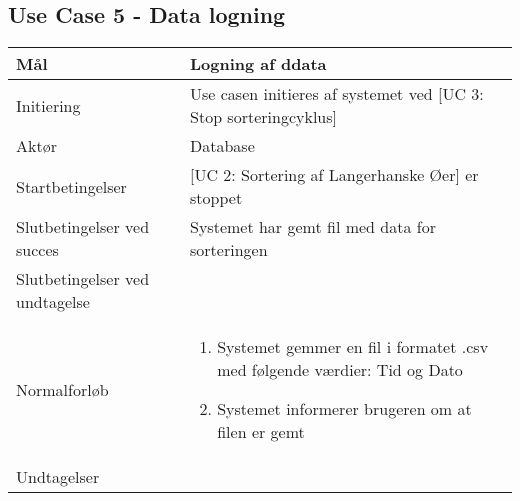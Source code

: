 \subsection{Use Case 5 - Data logning}
\begin{center}
		\begin{longtable}{ | m{4cm} | m{8cm}| } 
			\hline
			Mål & Logning af ddata \\ 
			\hline
			Initiering &  Use casen initieres af systemet ved [UC 3: Stop sorteringcyklus]\\
			\hline
			Aktør & Database \\ 
			\hline
			Startbetingelser & [UC 2: Sortering af Langerhanske Øer] er stoppet \\
			\hline	
			Slutbetingelser ved succes & Systemet har gemt fil med data for sorteringen \\
			\hline
			Slutbetingelser ved undtagelse &  \\
			\hline
			Normalforløb & \begin{enumerate}
				\setlength\itemsep{0cm} %
				\item Systemet gemmer en fil i formatet .csv med følgende værdier:
				\subitem Tid og Dato
				\item Systemet informerer brugeren om at filen er gemt
			\end{enumerate} \\ 
			\hline
			Undtagelser & \\
			\hline
		\end{longtable}
		
	\end{center}
	\pagebreak